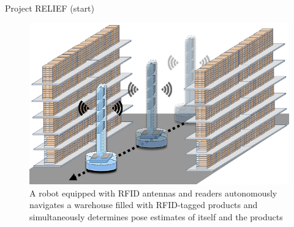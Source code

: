 \begin{frame}{Project RELIEF (start)}

\begin{figure}[H]\centering
  \includegraphics[scale=0.5]{figures/05/relief_concept.png}
  \caption{A robot equipped with RFID antennas and readers autonomously navigates a warehouse filled with RFID-tagged products and simultaneously determines pose estimates of itself and the products}
  \label{fig:relief_concept}
\end{figure}

\end{frame}
